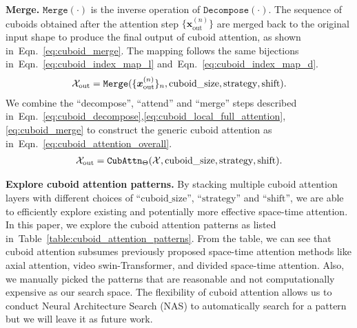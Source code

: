 \documentclass{article}
\newcommand{\tabref}[1]{Table~\ref{#1}}
\newcommand{\eqnref}[1]{Eqn.~\ref{#1}}
\renewcommand{\paragraph}[1]{\textbf{#1. }}
\begin{document}
\paragraph{Merge}
$\mathtt{Merge}(\cdot)$ is the inverse operation of $\mathtt{Decompose}(\cdot)$. The sequence of cuboids obtained after the attention step $\{\bm{x}^{(n)}_{\text{out}}\}$ are merged back to the original input shape to produce the final output of cuboid attention, as shown in~\eqnref{eq:cuboid_merge}. The mapping follows the same bijections in~\eqnref{eq:cuboid_index_map_l} and~\eqnref{eq:cuboid_index_map_d}.
\begin{align}
    \centering
    \mathcal{X}_{\text{out}} = \mathtt{Merge}(\{\bm{x}^{(n)}_{\text{out}}\}_n, \text{cuboid\_size}, \text{strategy}, \text{shift}).
    \label{eq:cuboid_merge}
\end{align}
We combine the ``decompose'', ``attend'' and ``merge'' steps described in~\eqnref{eq:cuboid_decompose},\ref{eq:cuboid_local_full_attention},\ref{eq:cuboid_merge} to construct the generic cuboid attention as in~\eqnref{eq:cuboid_attention_overall}.
\begin{align}
    \centering
    \mathcal{X}_{\text{out}} = \mathtt{CubAttn}_\Theta(\mathcal{X}, \text{cuboid\_size}, \text{strategy}, \text{shift}).
    \label{eq:cuboid_attention_overall}
\end{align}

\paragraph{Explore cuboid attention patterns} 
By stacking multiple cuboid attention layers with different choices of ``$\text{cuboid\_size}$'', ``$\text{strategy}$'' and ``$\text{shift}$'', we are able to efficiently explore existing and potentially more effective space-time attention. In this paper, we explore the cuboid attention patterns as listed in~\tabref{table:cuboid_attention_patterns}. From the table, we can see that cuboid attention  subsumes previously proposed space-time attention methods like axial attention, video swin-Transformer, and divided space-time attention. Also, we manually picked the patterns that are reasonable and not computationally expensive as our search space. The flexibility of cuboid attention allows us to conduct Neural Architecture Search (NAS) to automatically search for a pattern but we will leave it as future work.
\end{document}
